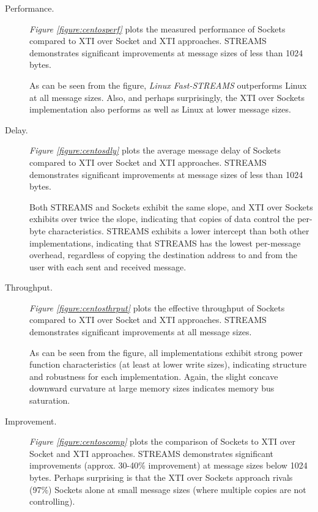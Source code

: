 \documentclass[letterpaper,final,notitlepage,twocolumn,10pt,twoside]{article}
\begin{document}
\begin{description}

\item[Performance.]

\textit{Figure \ref{figure:centosperf}}
plots the measured performance of Sockets compared to XTI over Socket and XTI approaches.  STREAMS
demonstrates significant improvements at message sizes of less than 1024 bytes.

As can be seen from the figure, \textsl{Linux Fast-STREAMS} outperforms Linux at all message sizes.
Also, and perhaps surprisingly, the XTI over Sockets implementation also performs as well as Linux
at lower message sizes.

\item[Delay.]

\textit{Figure \ref{figure:centosdly}}
plots the average message delay of Sockets compared to XTI over Socket and XTI approaches.  STREAMS
demonstrates significant improvements at message sizes of less than 1024 bytes.

Both STREAMS and Sockets exhibit the same slope, and XTI over Sockets exhibits over twice the slope,
indicating that copies of data control the per-byte characteristics.  STREAMS exhibits a lower
intercept than both other implementations, indicating that STREAMS has the lowest per-message
overhead, regardless of copying the destination address to and from the user with each sent and
received message.

\item[Throughput.]

\textit{Figure \ref{figure:centosthrput}}
plots the effective throughput of Sockets compared to XTI over Socket and XTI approaches.  STREAMS
demonstrates significant improvements at all message sizes.

As can be seen from the figure, all implementations exhibit strong power function characteristics
(at least at lower write sizes), indicating structure and robustness for each implementation.
Again, the slight concave downward curvature at large memory sizes indicates memory bus saturation.

\item[Improvement.]

\textit{Figure \ref{figure:centoscomp}}
plots the comparison of Sockets to XTI over Socket and XTI approaches.  STREAMS demonstrates
significant improvements (approx. 30-40\% improvement) at message sizes below 1024 bytes.  Perhaps
surprising is that the XTI over Sockets approach rivals (97\%) Sockets alone at small message sizes
(where multiple copies are not controlling).

\end{description}
\end{document}
